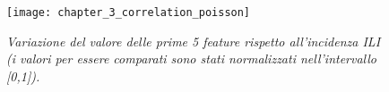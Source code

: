 \begin{figure}[p]
\texttt{[image: chapter\_3\_correlation\_poisson]}
\caption{\textit{Variazione del valore delle prime 5 feature rispetto all'incidenza ILI (i valori per essere comparati sono stati normalizzati nell'intervallo [0,1]).}}
\label{fig:ch_3_correlation_poisson}
\centering
\end{figure}